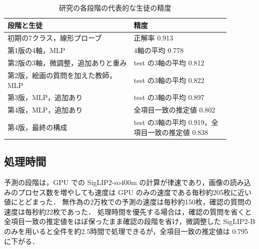 \begin{table}[t]
    \centering
    \caption{研究の各段階の代表的な生徒の精度}
    \label{tab_progress}
    \small
    \begin{tabular}{>{\raggedright\arraybackslash}p{0.5\linewidth}>{\raggedright\arraybackslash}p{0.38\linewidth}}
        \toprule
        段階と生徒 & 精度 \\
        \midrule
        初期の7クラス，線形プローブ & 正解率 0.913 \\
        第1版の4軸，MLP & 4軸の平均 0.778 \\
        第2版の3軸，微調整，追加ありと重み & test の3軸の平均 0.812 \\
        第2版，絵画の質問を加えた教師，MLP & test の3軸の平均 0.822 \\
        第3版，MLP，追加あり & test の3軸の平均 0.897 \\
        第4版，MLP，追加あり & 全項目一致の推定値 0.802 \\
        第4版，最終の構成 & test の3軸の平均 0.919，全項目一致の推定値 0.838 \\
        \bottomrule
    \end{tabular}
\end{table}

\subsection{処理時間}
予測の段階は，GPU での SigLIP2-so400m の計算が律速であり，画像の読み込みのプロセス数を増やしても速度は GPU のみの速度である毎秒約205枚に近い値にとどまった．
無作為の2万枚での予測の速度は毎秒約150枚，確認の質問の速度は毎秒約22枚であった．
処理時間を優先する場合は，確認の質問を省くと全項目一致の推定値をほぼ保ったまま確認の段階を省け，微調整した SigLIP2-B のみを用いると全件を約2.5時間で処理できるが，全項目一致の推定値は 0.795 に下がる．

